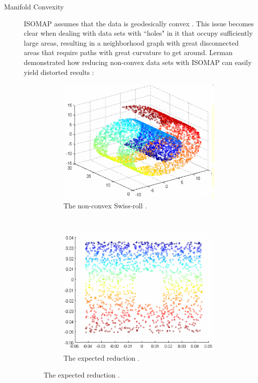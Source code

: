 \begin{description}
	\item[Manifold Convexity] ISOMAP assumes that the data is geodesically convex \cite{donoho2002does}. This issue becomes clear when dealing with data sets with ``holes" in it that occupy sufficiently large areas, resulting in a neighborhood graph with great disconnected areas that require paths with great curvature to get around. Lerman demonstrated how reducing non-convex data sets with ISOMAP can easily yield distorted results \cite{lerman2005}:
	\begin{figure}[H]
		\centering
		\begin{subfigure}[H]{.45\linewidth}
			\includegraphics[width=\linewidth]{img/convexity/original.png}
			\captionsetup{justification=centering}
			\caption{The non-convex Swiss-roll \protect\footnotemark[6].}
		\end{subfigure}
		~
		\begin{subfigure}[H]{.45\linewidth}
			\includegraphics[width=\linewidth]{img/convexity/expected.png}
			\captionsetup{justification=centering}
			\caption{The expected reduction \protect\footnotemark[6].}
		\end{subfigure}
		\newline\newline


\end{figure}
\end{description}
